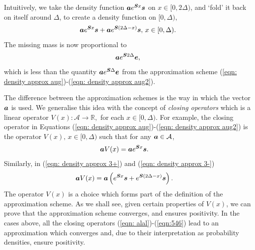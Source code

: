 Intuitively, we take the density function \(\boldsymbol ae^{\boldsymbol{S}x}\boldsymbol s\) on \(x \in [0,2\Delta)\), and `fold' it back on itself around \(\Delta\), to create a density function on \([0,\Delta)\), 
\[\boldsymbol ae^{\boldsymbol{S}x}\boldsymbol s +\boldsymbol ae^{\boldsymbol{S}(2\Delta-x)}\boldsymbol s,\, x \in [0,\Delta).\]
The missing mass is now proportional to 
\[\boldsymbol a e^{\boldsymbol S 2\Delta}\boldsymbol e,\]
which is less than the quantity \(\boldsymbol a e^{\boldsymbol S \Delta}\boldsymbol e\) from the approximation scheme (\ref{eqn: density approx aug})-(\ref{eqn: density approx aug2}).


The difference between the approximation schemes is the way in which the vector \(\boldsymbol a\) is used. We generalise this idea with the concept of \emph{closing operators} which is a linear operator \(V(x):\mathcal A \to \mathbb R,\) for each \(x\in[0,\Delta)\). For example, the closing operator in Equations (\ref{eqn: density approx aug})-(\ref{eqn: density approx aug2}) is the operator \(V(x),\,x\in[0,\Delta)\) such that for any \(\boldsymbol a \in \mathcal A\), 
\begin{align}
	\boldsymbol a V(x) &= \boldsymbol a e^{\boldsymbol Sx}\boldsymbol s.\label{eqn: alal}
\end{align}
Similarly, in (\ref{eqn: density approx 3+}) and (\ref{eqn: density approx 3-}) 
\begin{align}
	\boldsymbol a V(x) &= \boldsymbol a \left(e^{ \boldsymbol{S}x} \boldsymbol s + e^{ \boldsymbol{S}(2\Delta-x)} \boldsymbol s\right).\label{eqn:546}
\end{align}
The operator \(V(x)\) is a choice which forms part of the definition of the approximation scheme. As we shall see, given certain properties of \(V(x)\), we can prove that the approximation scheme converges, and ensures positivity. In the cases above, all the closing operators (\ref{eqn: alal})-(\ref{eqn:546}) lead to an approximation which converges and, due to their interpretation as probability densities, ensure positivity. 

